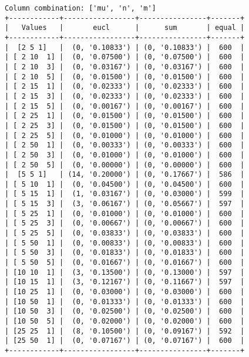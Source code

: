\documentclass{article}
\begin{document}
\begin{verbatim}
Column combination: ['mu', 'n', 'm']
+------------+-----------------+----------------+-------+
|   Values   |       eucl      |      sum       | equal |
+------------+-----------------+----------------+-------+
|  [2 5 1]   |  (0, '0.10833') | (0, '0.10833') |  600  |
| [ 2 10  1] |  (0, '0.07500') | (0, '0.07500') |  600  |
| [ 2 10  3] |  (0, '0.03167') | (0, '0.03167') |  600  |
| [ 2 10  5] |  (0, '0.01500') | (0, '0.01500') |  600  |
| [ 2 15  1] |  (0, '0.02333') | (0, '0.02333') |  600  |
| [ 2 15  3] |  (0, '0.02333') | (0, '0.02333') |  600  |
| [ 2 15  5] |  (0, '0.00167') | (0, '0.00167') |  600  |
| [ 2 25  1] |  (0, '0.01500') | (0, '0.01500') |  600  |
| [ 2 25  3] |  (0, '0.01500') | (0, '0.01500') |  600  |
| [ 2 25  5] |  (0, '0.01000') | (0, '0.01000') |  600  |
| [ 2 50  1] |  (0, '0.00333') | (0, '0.00333') |  600  |
| [ 2 50  3] |  (0, '0.01000') | (0, '0.01000') |  600  |
| [ 2 50  5] |  (0, '0.00000') | (0, '0.00000') |  600  |
|  [5 5 1]   | (14, '0.20000') | (0, '0.17667') |  586  |
| [ 5 10  1] |  (0, '0.04500') | (0, '0.04500') |  600  |
| [ 5 15  1] |  (1, '0.03167') | (0, '0.03000') |  599  |
| [ 5 15  3] |  (3, '0.06167') | (0, '0.05667') |  597  |
| [ 5 25  1] |  (0, '0.01000') | (0, '0.01000') |  600  |
| [ 5 25  3] |  (0, '0.00667') | (0, '0.00667') |  600  |
| [ 5 25  5] |  (0, '0.03833') | (0, '0.03833') |  600  |
| [ 5 50  1] |  (0, '0.00833') | (0, '0.00833') |  600  |
| [ 5 50  3] |  (0, '0.01833') | (0, '0.01833') |  600  |
| [ 5 50  5] |  (0, '0.01667') | (0, '0.01667') |  600  |
| [10 10  1] |  (3, '0.13500') | (0, '0.13000') |  597  |
| [10 15  1] |  (3, '0.12167') | (0, '0.11667') |  597  |
| [10 25  1] |  (0, '0.03000') | (0, '0.03000') |  600  |
| [10 50  1] |  (0, '0.01333') | (0, '0.01333') |  600  |
| [10 50  3] |  (0, '0.02500') | (0, '0.02500') |  600  |
| [10 50  5] |  (0, '0.02000') | (0, '0.02000') |  600  |
| [25 25  1] |  (8, '0.10500') | (0, '0.09167') |  592  |
| [25 50  1] |  (0, '0.07167') | (0, '0.07167') |  600  |
+------------+-----------------+----------------+-------+
\end{verbatim}
\end{document}
